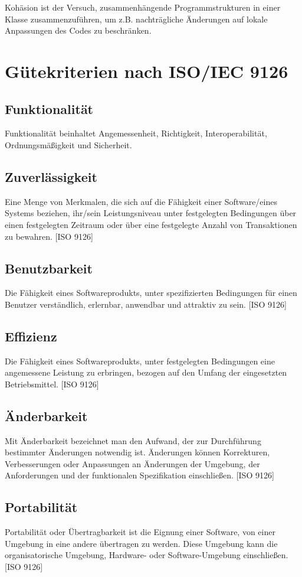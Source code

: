 \documentclass[10pt]{scrreprt}
\begin{document}
Kohäsion ist der Versuch, zusammenhängende Programmstrukturen in einer Klasse zusammenzuführen, um z.B. nachträgliche Änderungen auf lokale Anpassungen des Codes zu beschränken.


\section{Gütekriterien nach ISO/IEC 9126}
\subsection*{Funktionalität}
Funktionalität beinhaltet Angemessenheit, Richtigkeit, Interoperabilität, Ordnungsmäßigkeit und Sicherheit.

\subsection*{Zuverlässigkeit}
Eine Menge von Merkmalen, die sich auf die Fähigkeit einer Software/eines Systems beziehen, ihr/sein Leistungsniveau unter festgelegten Bedingungen über einen festgelegten Zeitraum oder über eine festgelegte Anzahl von Transaktionen zu bewahren. [ISO 9126]

\subsection*{Benutzbarkeit}
Die Fähigkeit eines Softwareprodukts, unter spezifizierten Bedingungen für einen Benutzer verständlich, erlernbar, anwendbar und attraktiv zu sein. [ISO 9126]

\subsection*{Effizienz}
Die Fähigkeit eines Softwareprodukts, unter festgelegten Bedingungen eine angemessene Leistung zu erbringen, bezogen auf den Umfang der eingesetzten Betriebsmittel. [ISO 9126]

\subsection*{Änderbarkeit}
Mit Änderbarkeit bezeichnet man den Aufwand, der zur Durchführung bestimmter Änderungen notwendig ist. Änderungen können Korrekturen, Verbesserungen oder Anpassungen an Änderungen der Umgebung, der Anforderungen und der funktionalen Spezifikation einschließen. [ISO 9126]

\subsection*{Portabilität}
Portabilität oder Übertragbarkeit ist die Eignung einer Software, von einer Umgebung in eine andere übertragen zu werden. Diese Umgebung kann die organisatorische Umgebung, Hardware- oder Software-Umgebung einschließen. [ISO 9126]
\end{document}
